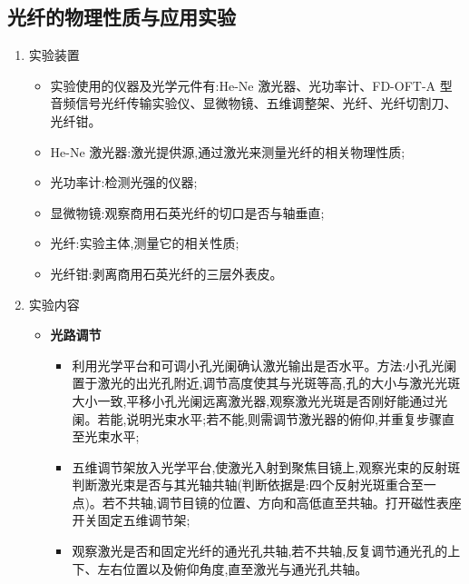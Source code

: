\documentclass[12pt, a4paper]{article}
\begin{document}
\subsection{光纤的物理性质与应用实验}
\begin{enumerate}
    \item 实验装置
    \begin{itemize}
    \item 实验使用的仪器及光学元件有:He-Ne 激光器、光功率计、FD-OFT-A 型音频信号光纤传输实验仪、显微物镜、五维调整架、光纤、光纤切割刀、光纤钳。
    \item He-Ne 激光器:激光提供源,通过激光来测量光纤的相关物理性质;
    \item 光功率计:检测光强的仪器;
    \item 显微物镜:观察商用石英光纤的切口是否与轴垂直;
    \item 光纤:实验主体,测量它的相关性质;
    \item 光纤钳:剥离商用石英光纤的三层外表皮。
    \end{itemize}
    
    \item 实验内容
    \begin{itemize}
        \item \textbf{光路调节}
        \begin{itemize}
            \item 利用光学平台和可调小孔光阑确认激光输出是否水平。方法:小孔光阑置于激光的出光孔附近,调节高度使其与光斑等高,孔的大小与激光光斑大小一致,平移小孔光阑远离激光器,观察激光光斑是否刚好能通过光阑。若能,说明光束水平;若不能,则需调节激光器的俯仰,并重复步骤直至光束水平;
             \item 五维调节架放入光学平台,使激光入射到聚焦目镜上,观察光束的反射斑判断激光束是否与其光轴共轴(判断依据是:四个反射光斑重合至一点)。若不共轴,调节目镜的位置、方向和高低直至共轴。打开磁性表座开关固定五维调节架;
             \item 观察激光是否和固定光纤的通光孔共轴,若不共轴,反复调节通光孔的上下、左右位置以及俯仰角度,直至激光与通光孔共轴。
        \end{itemize}


\end{itemize}
\end{enumerate}
\end{document}
